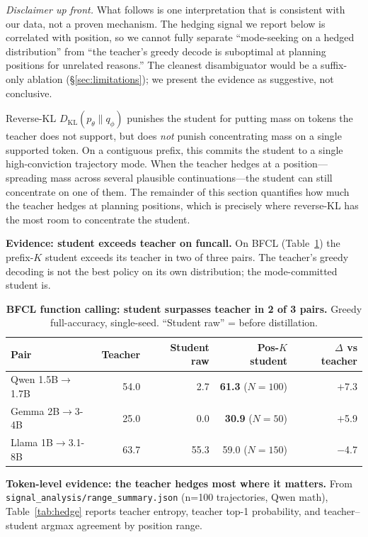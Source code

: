 \documentclass[10pt]{article}
\begin{document}
\emph{Disclaimer up front.} What follows is one interpretation that is consistent with our data, not a proven mechanism. The hedging signal we report below is correlated with position, so we cannot fully separate ``mode-seeking on a hedged distribution'' from ``the teacher's greedy decode is suboptimal at planning positions for unrelated reasons.'' The cleanest disambiguator would be a suffix-only ablation (\S\ref{sec:limitations}); we present the evidence as suggestive, not conclusive.

Reverse-KL $D_{\mathrm{KL}}(p_\theta \| q_\phi)$ punishes the student for putting mass on tokens the teacher does not support, but does \emph{not} punish concentrating mass on a single supported token. On a contiguous prefix, this commits the student to a single high-conviction trajectory mode. When the teacher hedges at a position---spreading mass across several plausible continuations---the student can still concentrate on one of them. The remainder of this section quantifies how much the teacher hedges at planning positions, which is precisely where reverse-KL has the most room to concentrate the student.

\textbf{Evidence: student exceeds teacher on funcall.} On BFCL (Table~\ref{tab:funcall}) the prefix-$K$ student exceeds its teacher in two of three pairs. The teacher's greedy decoding is not the best policy on its own distribution; the mode-committed student is.

\begin{table}[h]
\centering
\caption{\textbf{BFCL function calling: student surpasses teacher in 2 of 3 pairs.} Greedy full-accuracy, single-seed. ``Student raw'' = before distillation.}
\label{tab:funcall}
\small
\begin{tabular}{@{}lrrrr@{}}
\toprule
\textbf{Pair} & \textbf{Teacher} & \textbf{Student raw} & \textbf{Pos-$K$ student} & \textbf{$\Delta$ vs teacher} \\
\midrule
Qwen 1.5B$\to$1.7B  & 54.0 &  2.7 & \textbf{61.3} ($N{=}100$) & $+$7.3 \\
Gemma 2B$\to$3-4B   & 25.0 &  0.0 & \textbf{30.9} ($N{=}50$)  & $+$5.9 \\
Llama 1B$\to$3.1-8B & 63.7 & 55.3 & \phantom{\textbf{}}59.0\phantom{\textbf{}} ($N{=}150$) & $-$4.7 \\
\bottomrule
\end{tabular}
\end{table}

\textbf{Token-level evidence: the teacher hedges most where it matters.} From \texttt{signal\_analysis/range\_summary.json} (n=100 trajectories, Qwen math), Table~\ref{tab:hedge} reports teacher entropy, teacher top-1 probability, and teacher--student argmax agreement by position range.
\end{document}
